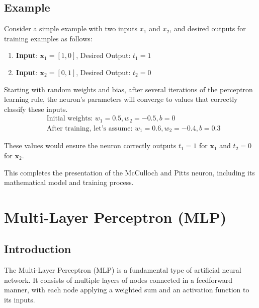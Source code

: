 \documentclass[english]{article}
\begin{document}
\subsection{Example}

Consider a simple example with two inputs \( x_1 \) and \( x_2 \), and desired outputs for training examples as follows:

\begin{enumerate}
\item \textbf{Input}: \(\mathbf{x}_1 = [1, 0]\), Desired Output: \( t_1 = 1 \)
\item \textbf{Input}: \(\mathbf{x}_2 = [0, 1]\), Desired Output: \( t_2 = 0 \)
\end{enumerate}

Starting with random weights and bias, after several iterations of the perceptron learning rule, the neuron's parameters will converge to values that correctly classify these inputs.
\[
\boxed{
\begin{aligned}
&\text{Initial weights: } w_1 = 0.5, w_2 = -0.5, b = 0 \\
&\text{After training, let's assume: } w_1 = 0.6, w_2 = -0.4, b = 0.3
\end{aligned}
}
\]

These values would ensure the neuron correctly outputs \( t_1 = 1 \) for \(\mathbf{x}_1\) and \( t_2 = 0 \) for \(\mathbf{x}_2\).

This completes the presentation of the McCulloch and Pitts neuron, including its mathematical model and training process.




























\section{Multi-Layer Perceptron (MLP)}

\subsection{Introduction}
The Multi-Layer Perceptron (MLP)\cite{rosenblatt1958perceptron} is a fundamental type of artificial neural network. It consists of multiple layers of nodes connected in a feedforward manner, with each node applying a weighted sum and an activation function to its inputs.
\end{document}
